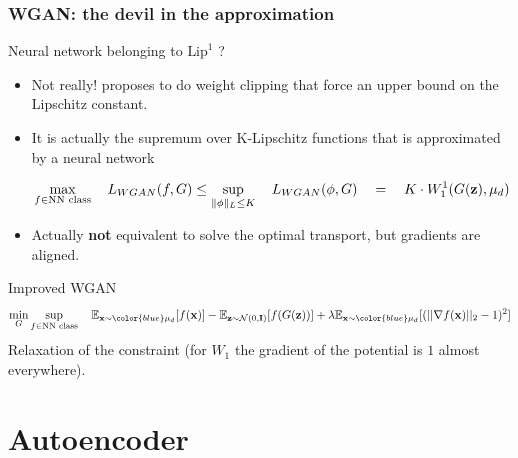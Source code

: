 \documentclass[french,9pt]{beamer}
\newcommand{\blue}[1]{{\color{blue} #1}}
\def\z{{\bf z}}
\newcommand{\x}{{\bf x}}
\begin{document}
  \begin{frame}
    \frametitle{WGAN: the devil in the approximation}

\begin{block}{Neural network belonging to  $\text{Lip}^1$ ?}

  \begin{itemize}
    \item Not really! \cite{arjovsky2017wasserstein} proposes to do weight clipping that force an upper bound on the Lipschitz constant.
    \item It is actually the supremum over K-Lipschitz functions that is approximated by a neural network 

  {  $$
      \max_{f \in \text{NN class}}
         \quad L_{WGAN}(f,G)
      \le \sup_{\|\phi\|_L \le K}
          \quad L_{WGAN}(\phi,G)\quad=\quad K \cdot W_1^1(G(\z),\mu_d)$$}
  \item Actually  {\bf not} equivalent to solve the optimal transport, but gradients are aligned.

  \end{itemize}
  
\end{block}\vspace{-2mm}


\begin{block}{Improved WGAN \cite{DBLP:journals/corr/GulrajaniAADC17}\vspace{-2mm}}
  $$
  \min_G\sup_{f \in \text{NN class}}\quad \mathbb{E}_{\x\sim\blue{\mu_d}}[ f(\x)] - \mathbb{E}_{\z\sim\mathcal{N}(0,\mathbf{I})} [f(G(\z))] + \lambda \mathbb{E}_{\x\sim\blue{\mu_d}}[ (||\nabla f(\x)||_2  - 1)^2 ]
  $$
  Relaxation of the constraint (for $W_1$ the gradient of the potential is $1$ almost everywhere).
\end{block}
  
  \end{frame}


\section{Autoencoder}


\end{document}
